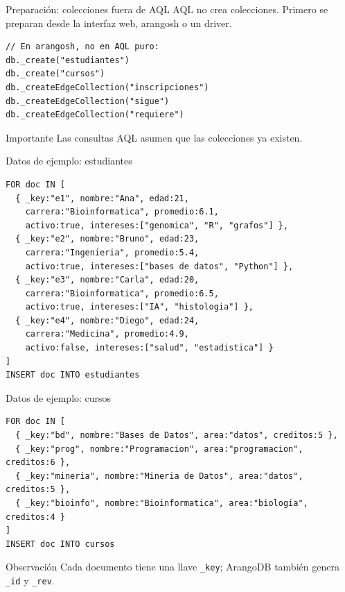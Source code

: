 \documentclass[aspectratio=169,11pt]{beamer}
\begin{document}
\begin{frame}[fragile]{Preparación: colecciones fuera de AQL}
AQL no crea colecciones. Primero se preparan desde la interfaz web, arangosh o un driver.

\begin{lstlisting}[language=AQL]
// En arangosh, no en AQL puro:
db._create("estudiantes")
db._create("cursos")
db._createEdgeCollection("inscripciones")
db._createEdgeCollection("sigue")
db._createEdgeCollection("requiere")
\end{lstlisting}

\begin{alertblock}{Importante}
Las consultas AQL asumen que las colecciones ya existen.
\end{alertblock}
\end{frame}

\begin{frame}[fragile]{Datos de ejemplo: estudiantes}
\begin{lstlisting}
FOR doc IN [
  { _key:"e1", nombre:"Ana", edad:21,
    carrera:"Bioinformatica", promedio:6.1,
    activo:true, intereses:["genomica", "R", "grafos"] },
  { _key:"e2", nombre:"Bruno", edad:23,
    carrera:"Ingenieria", promedio:5.4,
    activo:true, intereses:["bases de datos", "Python"] },
  { _key:"e3", nombre:"Carla", edad:20,
    carrera:"Bioinformatica", promedio:6.5,
    activo:true, intereses:["IA", "histologia"] },
  { _key:"e4", nombre:"Diego", edad:24,
    carrera:"Medicina", promedio:4.9,
    activo:false, intereses:["salud", "estadistica"] }
]
INSERT doc INTO estudiantes
\end{lstlisting}
\end{frame}

\begin{frame}[fragile]{Datos de ejemplo: cursos}
\begin{lstlisting}
FOR doc IN [
  { _key:"bd", nombre:"Bases de Datos", area:"datos", creditos:5 },
  { _key:"prog", nombre:"Programacion", area:"programacion", creditos:6 },
  { _key:"mineria", nombre:"Mineria de Datos", area:"datos", creditos:5 },
  { _key:"bioinfo", nombre:"Bioinformatica", area:"biologia", creditos:4 }
]
INSERT doc INTO cursos
\end{lstlisting}

\vspace{0.2cm}
\begin{block}{Observación}
Cada documento tiene una llave \texttt{\_key}; ArangoDB también genera \texttt{\_id} y \texttt{\_rev}.
\end{block}
\end{frame}
\end{document}
